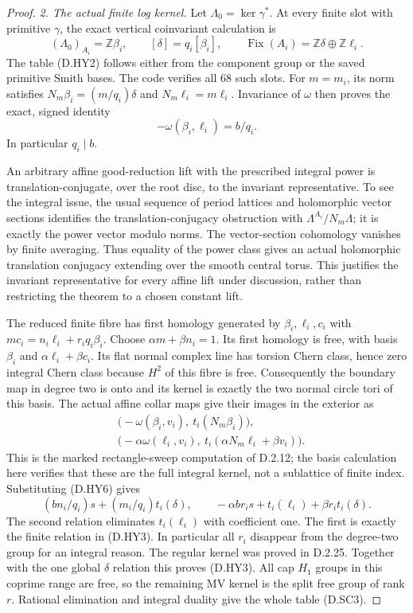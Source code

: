 \begin{proof}
\emph{2. The actual finite log kernel.}
Let $\Lambda_0=\ker\gamma^*$. At every finite slot with primitive
$\gamma$, the exact vertical coinvariant calculation is
\[
 (\Lambda_0)_{A_i}=\mathbb Z\beta_i,
 \qquad [\delta]=q_i[\beta_i],
 \qquad \operatorname{Fix}(A_i)=\mathbb Z\delta\oplus\mathbb Z\ell_i.
                                                               \tag{D.HY6}
\]
The table (D.HY2) follows either from the component group or the
saved primitive Smith bases. The code verifies all $68$ such slots.
For $m=m_i$, its norm satisfies
$N_m\beta_i=(m/q_i)\delta$ and $N_m\ell_i=m\ell_i$.
Invariance of $\omega$ then proves the exact, signed identity
\[
                     -\omega(\beta_i,\ell_i)=b/q_i.
\]
In particular $q_i\mid b$.

An arbitrary affine good-reduction lift with the prescribed integral
power is translation-conjugate, over the root disc, to the invariant
representative. To see the integral issue, the usual sequence of
period lattices and holomorphic vector sections identifies the
translation-conjugacy obstruction with
$\Lambda^{A_i}/N_m\Lambda$; it is exactly the power vector modulo
norms. The vector-section cohomology vanishes by finite averaging.
Thus equality of the power class gives an actual holomorphic
translation conjugacy extending over the smooth central torus.
This justifies the invariant representative for every affine lift
under discussion, rather than restricting the theorem to a chosen
constant lift.

The reduced finite fibre has first homology generated by
$\beta_i,\ell_i,c_i$ with
$m c_i=n_i\ell_i+r_iq_i\beta_i$. Choose
$\alpha m+\beta n_i=1$. Its first homology is free, with basis
$\beta_i$ and $\alpha\ell_i+\beta c_i$. Its flat normal complex
line has torsion Chern class, hence zero integral Chern class because
$H^2$ of this fibre is free. Consequently the boundary map in degree
two is onto and its kernel is exactly the two normal circle tori
of this basis. The actual affine collar maps give their images in
the exterior as
\[
\begin{split}
 &\bigl(-\omega(\beta_i,v_i),\ t_i(N_m\beta_i)\bigr),\\
 &\bigl(-\alpha\omega(\ell_i,v_i),\
               t_i(\alpha N_m\ell_i+\beta v_i)\bigr).
\end{split}                                                  \tag{D.HY7}
\]
This is the marked rectangle-sweep computation of D.2.12; the basis
calculation here verifies that these are the full integral kernel,
not a sublattice of finite index. Substituting (D.HY6) gives
\[
 (bn_i/q_i)s+(m_i/q_i)t_i(\delta),\qquad
 -\alpha b r_i s+t_i(\ell_i)+\beta r_i t_i(\delta).
\]
The second relation eliminates $t_i(\ell_i)$ with coefficient one.
The first is exactly the finite relation in (D.HY3). In particular
all $r_i$ disappear from the degree-two group for an integral reason.
The regular kernel was proved in D.2.25. Together with the one
global $\delta$ relation this proves (D.HY3). All cap $H_1$ groups
in this coprime range are free, so the remaining MV kernel is the
split free group of rank $r$. Rational elimination and integral
duality give the whole table (D.SC3).


\end{proof}
